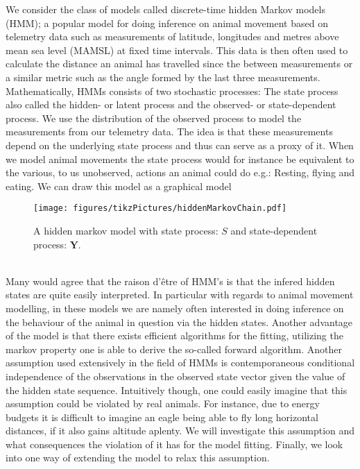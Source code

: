 We consider the class of models called discrete-time hidden Markov models (HMM); a popular model for doing inference on animal movement based on telemetry data such as measurements of latitude, longitudes and metres above mean sea level (MAMSL) at fixed time intervals. This data is then often used to calculate the distance an animal has travelled since the between measurements or a similar metric such as the angle formed by the last three measurements.\\ Mathematically, HMMs consists of two stochastic processes: The state process also called the hidden- or latent process and the observed- or state-dependent process. 
We use the distribution of the observed process to model the measurements from our telemetry data. The idea is that these measurements depend on the underlying state process and thus can serve as a proxy of it. When we model animal movements the state process would for instance be equivalent to the various, to us unobserved, actions an animal could do e.g.: Resting, flying and eating. We can draw this model as a graphical model
\begin{figure}[h]
    \centering
    \texttt{[image: figures/tikzPictures/hiddenMarkovChain.pdf]}
    \caption{A hidden markov model with state process: $S$ and state-dependent process: $\mathbf{Y}$.}
\end{figure}\\
Many would agree that the raison d'être of HMM's is that the infered hidden states are quite easily interpreted. In particular with regards to animal movement modelling, in these models we are namely often interested in doing inference on the behaviour of the animal in question via the hidden states. Another advantage of the model is that there exists efficient algorithms for the fitting, utilizing the markov property one is able to derive the so-called forward algorithm. Another assumption used extensively in the field of HMMs is contemporaneous conditional independence of the observations in the observed state vector given the value of the hidden state sequence. Intuitively though, one could easily imagine that this assumption could be violated by real animals. For instance, due to energy budgets it is difficult to imagine an eagle being able to fly long horizontal distances, if it also gains altitude aplenty. We will investigate this assumption and what consequences the violation of it has for the model fitting. Finally, we look into one way of extending the model to relax this assumption.
